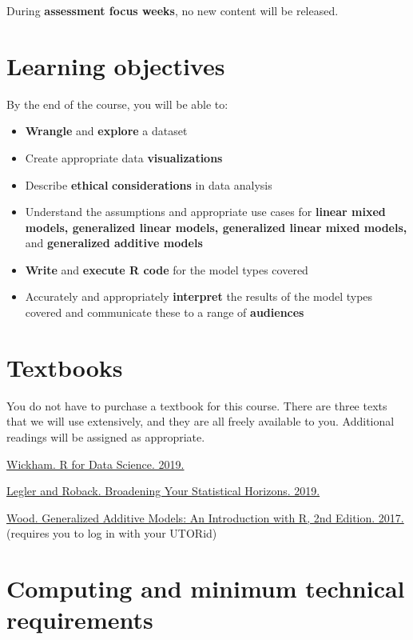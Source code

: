\documentclass[
  openany]{book}
\begin{document}
During \textbf{assessment focus weeks}, no new content will be released.

\hypertarget{learning-objectives}{%
\section{Learning objectives}\label{learning-objectives}}

By the end of the course, you will be able to:

\begin{itemize}
\item
  \textbf{Wrangle} and \textbf{explore} a dataset
\item
  Create appropriate data \textbf{visualizations}
\item
  Describe \textbf{ethical} \textbf{considerations} in data analysis
\item
  Understand the assumptions and appropriate use cases for \textbf{linear mixed models, generalized linear models, generalized linear mixed models,} and \textbf{generalized additive models}
\item
  \textbf{Write} and \textbf{execute R code} for the model types covered
\item
  Accurately and appropriately \textbf{interpret} the results of the model types covered and communicate these to a range of \textbf{audiences}
\end{itemize}

\hypertarget{textbooks}{%
\section{Textbooks}\label{textbooks}}

You do not have to purchase a textbook for this course. There are three texts that we will use extensively, and they are all freely available to you. Additional readings will be assigned as appropriate.

\href{https://r4ds.had.co.nz}{Wickham. R for Data Science. 2019.}

\href{https://bookdown.org/roback/bookdown-bysh/}{Legler and Roback. Broadening Your Statistical Horizons. 2019.}

\href{https://ebookcentral-proquest-com.myaccess.library.utoronto.ca/lib/utoronto/detail.action?docID=4862399}{Wood. Generalized Additive Models: An Introduction with R, 2nd Edition. 2017.} (requires you to log in with your UTORid)

\hypertarget{computing-and-minimum-technical-requirements}{%
\section{Computing and minimum technical requirements}\label{computing-and-minimum-technical-requirements}}
\end{document}
